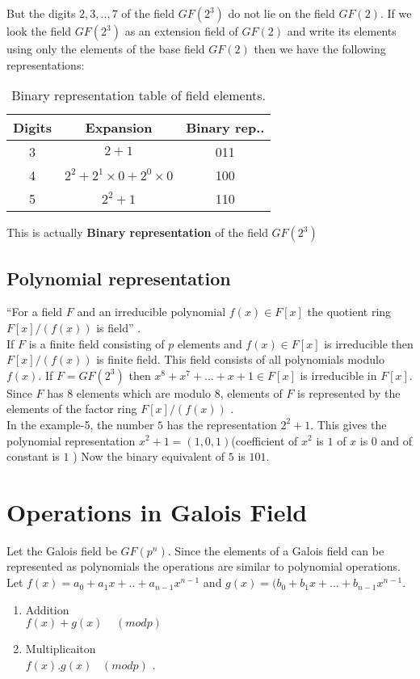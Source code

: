 But the digits \(2,3,..,7\) of the field \(GF(2^3)\) do not lie on the field \(GF(2)\). If we look the field \(GF(2^3)\) as an extension field of \(GF(2)\) and write its elements using only the elements of the base field \(GF(2)\) then we have the following representations:
\vspace{3mm}

\begin{table}[h!]
  \centering
\begin{tabular}{|c|c|c|}
    \hline
    Digits & Expansion & Binary rep..\\
    \hline
    3 & \(2+1\) & 011 \\
    4 & \(2^2+2^1 \times 0 +2^0 \times 0\) & 100 \\
    5 & \(2^2+1\) & 110 \\
    \hline
\end{tabular}
\caption{\small Binary representation table of field elements.}
\end{table}
\vspace{3mm}

This is actually \textbf{Binary representation} of the field \(GF(2^3)\)



\subsection{Polynomial representation}
``For a field \(F\) and an irreducible polynomial \(f(x) \in F[x]\) the quotient ring \(F[x]/(f(x))\) is field'' \cite{galois}.\\
If \(F\) is a finite field consisting of \(p\) elements and \(f(x) \in F[x]\) is irreducible then \(F[x]/(f(x))\) is finite field. This field consists of all polynomials modulo \(f(x)\). If \(F=GF(2^3)\) then \(x^8+x^7+...+x+1 \in F[x]\) is irreducible in \(F[x]\). Since \(F\) has \(8\) elements which are modulo \(8\), elements of \(F\) is represented by the elements of the factor ring \(F[x]/(f(x))\) \cite{aes}. \\


In the example-5, the number \(5\) has the representation \(2^2+1\). This gives the polynomial representation \(x^2+1=(1,0,1)\)(coefficient of \(x^2\) is \(1\) of \(x\) is \(0\) and of constant is \(1\) ) Now the binary equivalent of \(5\) is \(101\).

\section{Operations in Galois Field}
Let the Galois field be \(GF(p^n)\). Since the elements of a Galois field can be represented as polynomials the operations are similar to polynomial operations. Let \(f(x)=a_0+a_1x+..+a_{n-1}x^{n-1}\) and \(g(x)=(b_0+b_1x+...+b_{n-1}x^{n-1}\).
\begin{enumerate}
  \item Addition \\
  \(f(x)+g(x)\;\;\;\; (modp)\)
  \item Multiplicaiton \\
  \(f(x).g(x)\;\;\; (modp)\) \cite{aes}.
\end{enumerate}

